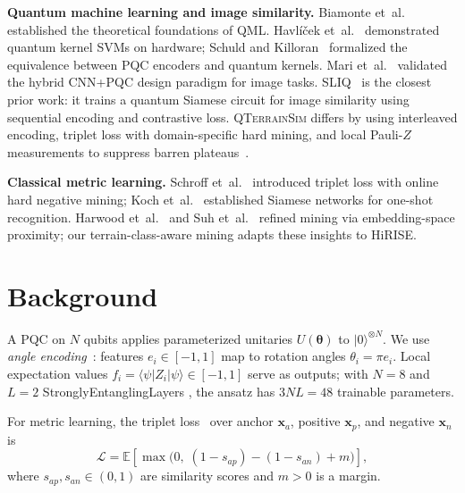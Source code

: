\documentclass[conference,a4paper]{IEEEtran}
\newcommand{\qts}{\textsc{QTerrainSim}}
\newcommand{\PauliZ}{Z}
\begin{document}
\textbf{Quantum machine learning and image similarity.}
Biamonte et~al.~\cite{biamonte2017qml} established the theoretical
foundations of QML.
Havl\'{i}\v{c}ek et~al.~\cite{havlicek2019supervised} demonstrated
quantum kernel SVMs on hardware; Schuld and
Killoran~\cite{schuld2019featurehilbert} formalized the equivalence between
PQC encoders and quantum kernels.
Mari et~al.~\cite{mari2020transfer} validated the hybrid CNN+PQC design
paradigm for image tasks.
SLIQ~\cite{silver2023sliq} is the closest prior work: it trains a quantum
Siamese circuit for image similarity using sequential encoding and
contrastive loss.
\qts{} differs by using interleaved encoding, triplet loss with domain-specific
hard mining, and local Pauli-$\PauliZ$ measurements to suppress barren
plateaus~\cite{cerezo2021costbarren,mcclean2018barren}.

\textbf{Classical metric learning.}
Schroff et~al.~\cite{schroff2015facenet} introduced triplet loss with
online hard negative mining; Koch et~al.~\cite{koch2015siamese} established
Siamese networks for one-shot recognition.
Harwood et~al.~\cite{harwood2017smartmining} and Suh
et~al.~\cite{suh2019stochastic} refined mining via embedding-space
proximity; our terrain-class-aware mining adapts these insights to HiRISE.

\section{Background}
\label{sec:background}

A PQC on $N$ qubits applies parameterized unitaries $U(\bm{\theta})$ to
$|0\rangle^{\otimes N}$.
We use \emph{angle encoding}~\cite{schuld2020circuitcentric}: features
$e_i\!\in\![-1,1]$ map to rotation angles $\theta_i = \pi e_i$.
Local expectation values $f_i = \langle\psi|\PauliZ_i|\psi\rangle\in[-1,1]$
serve as outputs; with $N{=}8$ and $L{=}2$ StronglyEntanglingLayers
\cite{bergholm2018pennylane}, the ansatz has $3NL{=}48$ trainable parameters.

For metric learning, the triplet loss~\cite{schroff2015facenet} over anchor
$\mathbf{x}_a$, positive $\mathbf{x}_p$, and negative $\mathbf{x}_n$ is
\begin{equation}
  \mathcal{L} = \mathbb{E}\!\left[
    \max\!\bigl(0,\;(1-s_{ap}) - (1-s_{an}) + m\bigr)
  \right],
  \label{eq:triplet}
\end{equation}
where $s_{ap},s_{an}\!\in\!(0,1)$ are similarity scores and $m>0$ is a margin.
\end{document}
